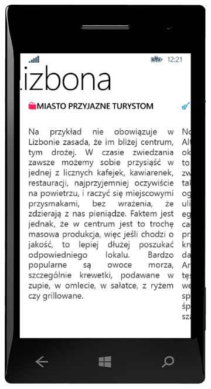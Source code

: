 \documentclass[a4paper]{book}
\begin{document}
\begin{figure}[H]
			\begin{subfigure}{0.3\textwidth}
				\includegraphics[width=\textwidth]{screenshots/mobile/mobile8.png}	
				\caption{\label{subfig:mobile_guidedetail2}}
			\end{subfigure}
			\hfill
			\begin{subfigure}{0.3\textwidth}

\end{subfigure}
\end{figure}
\end{document}

